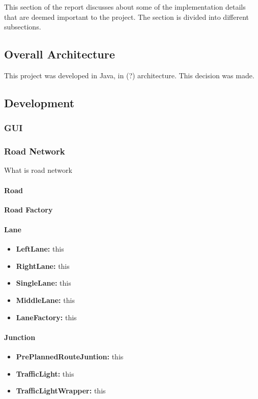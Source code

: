 \documentclass[11pt]{article}
\begin{document}
This section of the report discusses about some of the implementation details that are deemed important to the project. The section is divided into different subsections.
\subsection{Overall Architecture}
This project was developed in Java, in (?) architecture. This decision was made. 
\subsection{Development}
\subsubsection{GUI}

\subsubsection{Road Network}
What is road network
    \paragraph{Road}
    \textbf{Road Factory}\\
    \paragraph{Lane}
    \begin{itemize}[noitemsep]
    \item \textbf{LeftLane:} this  
    \item \textbf{RightLane:} this
    \item \textbf{SingleLane:} this
    \item \textbf{MiddleLane:} this  
    \item \textbf{LaneFactory:} this
    \end{itemize}
    \paragraph{Junction}
    \begin{itemize}[noitemsep]
    \item \textbf{PrePlannedRouteJuntion:} this  
    \item \textbf{TrafficLight:} this
    \item \textbf{TrafficLightWrapper:} this
    \end{itemize}
    
\end{document}
